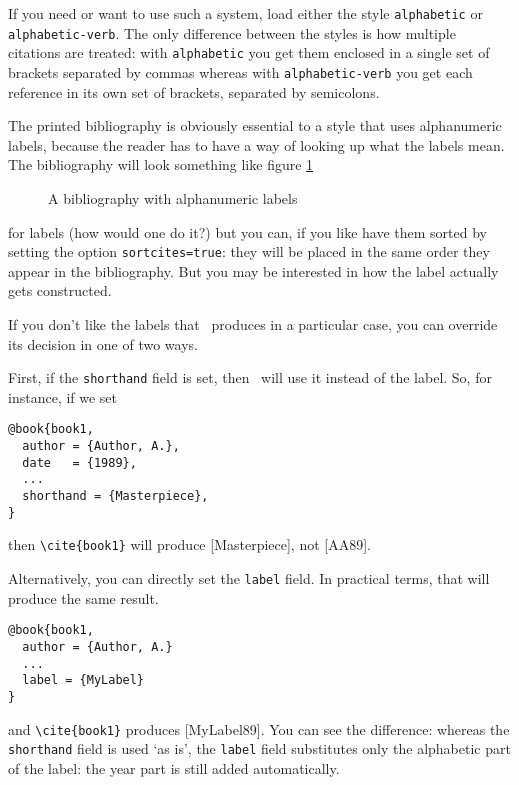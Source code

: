 If you need or want to use such a system, load either the style
\verb|alphabetic| or \verb|alphabetic-verb|. The only difference
between the styles is how multiple citations are treated: with
\verb|alphabetic| you get them enclosed in a single set of
brackets separated by
commas whereas with \verb|alphabetic-verb| you get each reference in
its own set of brackets, separated by
semicolons.

The printed bibliography is obviously essential to a style that uses
alphanumeric labels, because the reader has to have a way of looking
up what the labels mean. The bibliography will look something like
figure \ref{example:bibliography:alphabetic}

\begin{figure}
\caption{A bibliography with alphanumeric
  labels\label{example:bibliography:alphabetic}}
\end{figure}

 for labels (how
would one do it?) but you can, if you like have them sorted by setting
the option \verb|sortcites=true|: they will be placed in the same
order they appear in the bibliography. But you may be interested in
how the label actually gets constructed.

If you don't like the labels that \biblatex\ produces in a particular
case, you can override its decision in one of two ways.

First, if the \verb|shorthand| field is set, then \biblatex\ will use
it instead of the label. So, for instance, if we set
\begin{verbatim}
@book{book1,
  author = {Author, A.},
  date   = {1989},
  ...
  shorthand = {Masterpiece},
}
\end{verbatim}
then \verb|\cite{book1}| will produce [Masterpiece], not [AA89].

Alternatively, you can directly set the \verb|label| field. In
practical terms, that will produce the same result.
\begin{verbatim}
@book{book1,
  author = {Author, A.} 
  ...
  label = {MyLabel}
}
\end{verbatim}
and \verb|\cite{book1}| produces [MyLabel89]. You can see the difference:
whereas the \verb|shorthand| field is used `as is', the \verb|label|
field substitutes only the alphabetic part of the label: the year part
is still added automatically.

